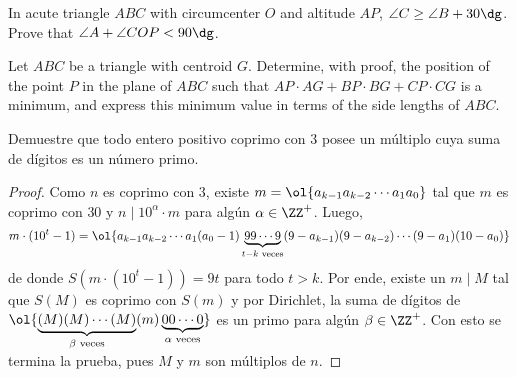 \begin{probMG}
	In acute triangle $ABC$ with circumcenter $O$ and altitude $AP$, $\angle C\ge\angle B+30\dg$. Prove that $\angle A+\angle COP<90\dg$.
\end{probMG}

\begin{probMR}
	Let $ABC$ be a triangle with centroid $G$. Determine, with proof, the position of the point $P$ in the plane of $ABC$ such that $AP\cdot AG+BP\cdot BG+CP\cdot CG$ is a minimum, and express this minimum value in terms of the side lengths of $ABC$.
\end{probMR}


\begin{probEG}
	Demuestre que todo entero positivo coprimo con $3$ posee un múltiplo cuya suma de dígitos es un número primo.
\end{probEG}

\begin{proof}
	Como $n$ es coprimo con $3$, existe $m=\ol{a_{k-1}a_{k-2}\cdots a_1a_0}$ tal que $m$ es coprimo con $30$ y $n\mid 10^\alpha\cdot m$ para algún $\alpha\in\ZZ^+$. Luego,
	\[m\cdot(10^t-1)=\ol{a_{k-1}a_{k-2}\cdots a_1(a_0-1)\underbrace{99\cdots 9}_{t-k\text{ veces}}(9-a_{k-1})(9-a_{k-2})\cdots(9-a_1)(10-a_0)}\]
	de donde $S(m\cdot(10^t-1))=9t$ para todo $t>k$. Por ende, existe un $m\mid M$ tal que $S(M)$ es coprimo con $S(m)$ y por Dirichlet, la suma de dígitos de $\ol{\underbrace{(M)(M)\cdots (M)}_{\beta\text{ veces}}(m)\underbrace{00\cdots 0}_{\alpha\text{ veces}}}$ es un primo para algún $\beta\in\ZZ^+$. Con esto se termina la prueba, pues $M$ y $m$ son múltiplos de $n$.
\end{proof}
